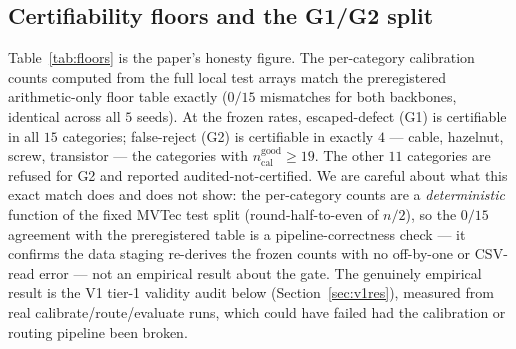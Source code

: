 \documentclass[preprint,11pt]{elsarticle}
\begin{document}
\subsection{Certifiability floors and the G1/G2 split}
\label{sec:floors}

Table~\ref{tab:floors} is the paper's honesty figure. The per-category calibration counts computed
from the full local test arrays match the preregistered arithmetic-only floor table exactly
($0/15$ mismatches for both backbones, identical across all $5$ seeds). At the frozen rates,
escaped-defect (G1) is certifiable in all $15$ categories; false-reject (G2) is certifiable
in exactly $4$ --- cable, hazelnut, screw, transistor --- the categories with
$n_{\text{cal}}^{\text{good}} \ge 19$. The other $11$ categories are refused for G2 and reported
audited-not-certified. We are careful about what this exact match does and does not show: the
per-category counts are a \emph{deterministic} function of the fixed MVTec test split
(round-half-to-even of $n/2$), so the $0/15$ agreement with the preregistered table is a
pipeline-correctness check --- it confirms the data staging re-derives the frozen counts with no
off-by-one or CSV-read error --- not an empirical result about the gate. The genuinely empirical
result is the V1 tier-1 validity audit below (Section~\ref{sec:v1res}), measured from real
calibrate/route/evaluate runs, which could have failed had the calibration or routing pipeline been
broken.
\end{document}
